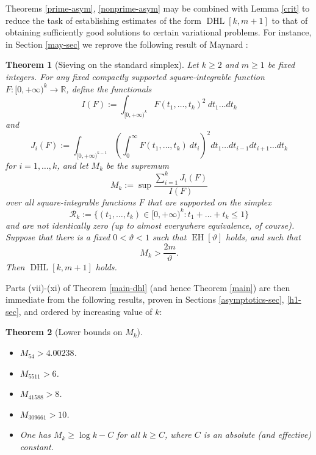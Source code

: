 \documentclass{bmcart}
\DeclareMathOperator*\EH{EH}
\DeclareMathOperator*\DHL{DHL}
\theoremstyle{plain}
\newtheorem{theorem}{Theorem}[section]
\theoremstyle{definition}
\newcommand\R{\mathbb{R}}
\begin{document}
Theorems \ref{prime-asym}, \ref{nonprime-asym} may be combined with Lemma \ref{crit} to reduce the task of establishing estimates of the form $\DHL[k,m+1]$ to that of obtaining sufficiently good solutions to certain variational problems.  For instance, in Section \ref{may-sec} we reprove the following result of Maynard \cite[Proposition 4.2]{maynard-new}:

\begin{theorem}[Sieving on the standard simplex]\label{maynard-thm}  Let $k \geq 2$ and $m \geq 1$ be fixed integers. For any fixed compactly supported square-integrable function $F: [0,+\infty)^k \to \R$, define the functionals
\begin{equation}\label{i-def}
I(F) := \int_{[0,+\infty)^k} F(t_1,\dots,t_k)^2\ dt_1 \dots dt_k
\end{equation}
and
\begin{equation}\label{ji-def}
 J_i(F) := \int_{[0,+\infty)^{k-1}} \left(\int_0^\infty F(t_1,\dots,t_k)\ dt_i\right)^2 dt_1 \dots dt_{i-1} dt_{i+1} \dots dt_k
\end{equation}
for $i=1,\dots,k$, and let $M_k$ be the supremum
\begin{equation}\label{mk4}
 M_k := \sup \frac{\sum_{i=1}^k J_i(F)}{I(F)}
\end{equation}
over all square-integrable functions $F$ that are supported on the simplex
$$ {\mathcal R}_k := \{ (t_1,\dots,t_k) \in [0,+\infty)^k: t_1+\dots+t_k \leq 1 \}$$
and are not identically zero (up to almost everywhere equivalence, of course).  Suppose that there is a fixed $0 < \vartheta < 1$ such that $\EH[\vartheta]$ holds, and such that
$$ M_k > \frac{2m}{\vartheta}.$$
Then $\DHL[k,m+1]$ holds.
\end{theorem}

Parts (vii)-(xi) of Theorem \ref{main-dhl} (and hence Theorem \ref{main}) are then immediate from the following results, proven in Sections \ref{asymptotics-sec}, \ref{h1-sec}, and ordered by increasing value of $k$:

\begin{theorem}[Lower bounds on $M_k$]\label{mlower}\
\begin{itemize}
\item[(vii)] $M_{54} > 4.00238$.
\item[(viii)] $M_{5511} > 6$.
\item[(ix)] $M_{41588} > 8$.
\item[(x)] $M_{309661} > 10$.
\item[(xi)] One has $M_k \geq \log k - C$ for all $k \geq C$, where $C$ is an absolute (and effective) constant.
\end{itemize}
\end{theorem}
\end{document}
